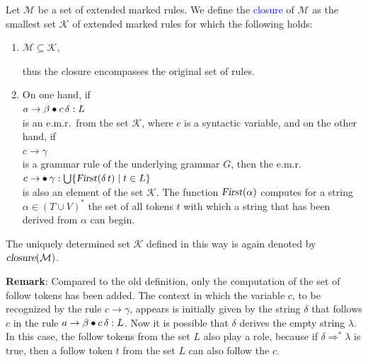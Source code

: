 \begin{Definition}
  Let $\mathcal{M}$ be a set of extended marked rules. We define the \textcolor{blue}{closure} of $\mathcal{M}$
  as the smallest set $\mathcal{K}$ of extended marked rules for which the following holds:
  \begin{enumerate}
  \item $\mathcal{M} \subseteq \mathcal{K}$,

        thus the closure encompasses the original set of rules.
  \item On one hand, if
        \\[0.2cm]
        \hspace*{1.3cm}
        $a \rightarrow \beta \mdot c\, \delta: L$
        \\[0.2cm]
        is an e.m.r.~from the set $\mathcal{K}$, where $c$ is a syntactic
        variable, and on the other hand, if
        \\[0.2cm]
        \hspace*{1.3cm}
        $c \rightarrow \gamma$
        \\[0.2cm]
        is a grammar rule of the underlying grammar $G$, then the e.m.r.\@
        \\[0.2cm]
        \hspace*{1.3cm}
        $c \rightarrow \mdot \gamma: \bigcup \{ \textsl{First}(\delta\, t) \mid t \in L \}$
        \\[0.2cm]
        is also an element of the set $\mathcal{K}$. The function $\textsl{First}(\alpha)$ computes for
        a string $\alpha \in (T \cup V)^*$ the set of all tokens $t$ with which a string
        that has been derived from $\alpha$ can begin.
  \end{enumerate}
  The uniquely determined set $\mathcal{K}$ defined in this way is again denoted by
  $\textsl{closure}(\mathcal{M})$. \eox
\end{Definition}

\noindent
\textbf{Remark}: Compared to the old definition, only the computation of the set of follow tokens has been
added. The context in which the variable $c$, to be recognized by the rule $c \rightarrow \gamma$, appears is initially
given by the string $\delta$ that follows $c$ in the rule $a \rightarrow \beta \mdot c\, \delta:L$.  Now it is
possible that $\delta$ derives the empty string $\lambda$. In this case, the follow tokens from the set $L$
also play a role, because if $\delta \Rightarrow^* \lambda$ is true, then a follow token $t$ from the set $L$
can also follow the $c$. \eox 
\vspace*{0.1cm}

